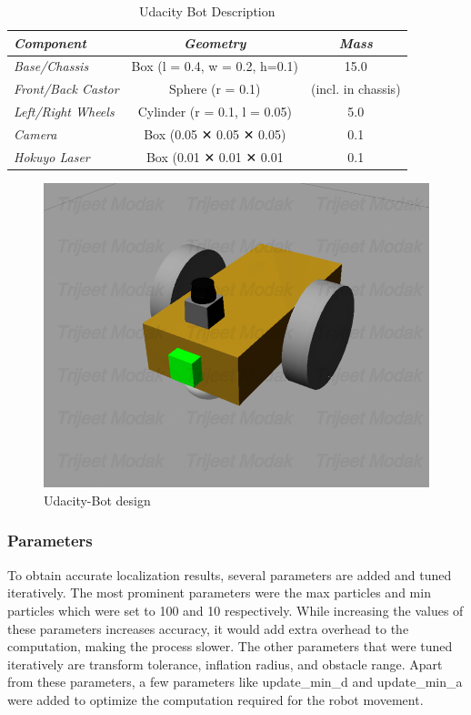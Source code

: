 \documentclass[10pt,journal,compsoc]{IEEEtran}
\begin{document}
\begin{table}[h]
\renewcommand{\arraystretch}{1.5}
\centering
\begin{tabular}{|l|c|c|}
\hline
\textit{\textbf{Component}} & \textit{\textbf{Geometry}}    & \textit{\textbf{Mass}} \\ \hline
\textit{Base/Chassis}       & Box (l = 0.4, w = 0.2, h=0.1) & 15.0                   \\ \hline
\textit{Front/Back Castor}  & Sphere (r = 0.1)              & (incl. in chassis)     \\ \hline
\textit{Left/Right  Wheels} & Cylinder (r = 0.1, l = 0.05)  & 5.0                    \\ \hline
\textit{Camera}             & Box (0.05 ✕ 0.05 ✕ 0.05)      & 0.1                    \\ \hline
\textit{Hokuyo Laser}       & Box (0.01 ✕ 0.01 ✕ 0.01       & 0.1                    \\ \hline
\end{tabular}
\vspace{5pt}
\caption{Udacity Bot Description}
\label{table:desc-udacity-bot}
\end{table}

\begin{figure}[h]
    \centering
    \includegraphics[scale=0.225]{imgs/udacity-bot.png}
    \centering
    \caption{Udacity-Bot design}
    \label{fig:udacity-bot}
\end{figure}


\subsubsection{Parameters}
To obtain accurate localization results, several parameters are added and tuned iteratively. The most prominent parameters were the max particles and min particles which were set to 100 and 10 respectively. While increasing the values of these parameters increases accuracy, it would add extra overhead to the computation, making the process slower. The other parameters that were tuned iteratively are transform tolerance, inflation radius, and obstacle range. Apart from these parameters, a few parameters like update\_min\_d  and update\_min\_a were added to optimize the computation required for the robot movement.
\end{document}
